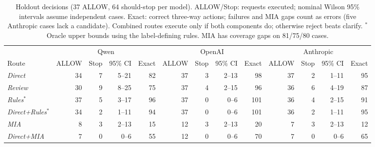 \begin{table}[t]
\centering
\caption{Holdout decisions (37 ALLOW, 64 should-stop per model). ALLOW/Stop: requests executed; nominal Wilson 95\% intervals assume independent cases. Exact: correct three-way actions; failures and MIA gaps count as errors (five Anthropic cases lack a candidate). Combined routes execute only if both components do; otherwise reject beats clarify. $^*$Oracle upper bounds using the label-defining rules. MIA has coverage gaps on 81/75/80 cases.}
\label{tab:quality}
{\small
\begin{tabular}{lrrrrrrrrrrrr}
\toprule
 & \multicolumn{4}{c}{Qwen} & \multicolumn{4}{c}{OpenAI} & \multicolumn{4}{c}{Anthropic} \\
\cmidrule(lr){2-5}\cmidrule(lr){6-9}\cmidrule(lr){10-13}
Route & ALLOW & Stop & 95\% CI & Exact & ALLOW & Stop & 95\% CI & Exact & ALLOW & Stop & 95\% CI & Exact \\
\midrule
\emph{Direct} & 34 & 7 & 5--21 & 82 & 37 & 3 & 2--13 & 98 & 37 & 2 & 1--11 & 95 \\
\emph{Review} & 30 & 9 & 8--25 & 75 & 37 & 4 & 2--15 & 96 & 36 & 6 & 4--19 & 87 \\
\emph{Rules$^*$} & 37 & 5 & 3--17 & 96 & 37 & 0 & 0--6 & 101 & 36 & 4 & 2--15 & 91 \\
\emph{Direct+Rules$^*$} & 34 & 2 & 1--11 & 94 & 37 & 0 & 0--6 & 101 & 36 & 2 & 1--11 & 95 \\
\emph{MIA} & 8 & 3 & 2--13 & 15 & 12 & 3 & 2--13 & 20 & 7 & 3 & 2--13 & 12 \\
\emph{Direct+MIA} & 7 & 0 & 0--6 & 55 & 12 & 0 & 0--6 & 70 & 7 & 0 & 0--6 & 65 \\
\bottomrule
\end{tabular}
}
\end{table}
